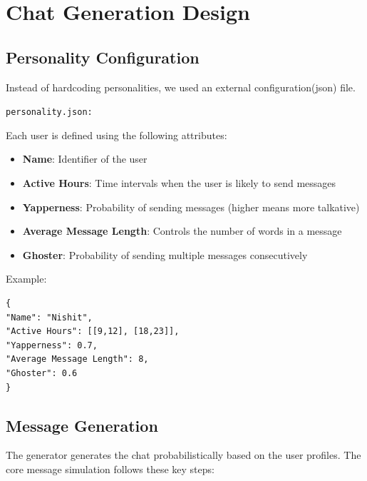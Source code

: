 \documentclass[12pt]{article}
\begin{document}
\section{Chat Generation Design}

\subsection{Personality Configuration}

Instead of hardcoding personalities, we used an external configuration(json) file.

\texttt{personality.json:}

Each user is defined using the following attributes:

\begin{itemize}
\item \textbf{Name}: Identifier of the user
\item \textbf{Active Hours}: Time intervals when the user is likely to send messages
\item \textbf{Yapperness}: Probability of sending messages (higher means more talkative)
\item \textbf{Average Message Length}: Controls the number of words in a message
\item \textbf{Ghoster}: Probability of sending multiple messages consecutively
\end{itemize}

Example:

\begin{verbatim}
{
"Name": "Nishit",
"Active Hours": [[9,12], [18,23]],
"Yapperness": 0.7,
"Average Message Length": 8,
"Ghoster": 0.6
}
\end{verbatim}

\subsection{Message Generation}


The generator generates the chat probabilistically based on the user profiles. The core message simulation follows these key steps:
\end{document}
